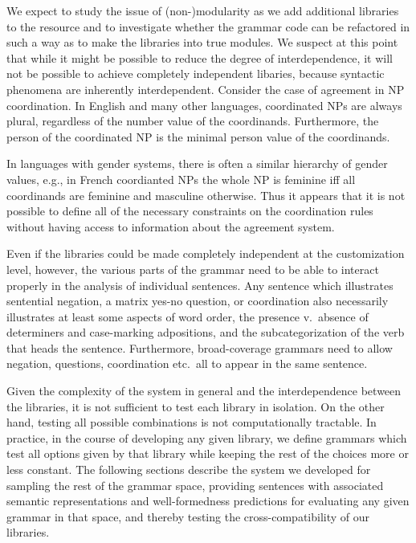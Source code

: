 \documentclass[11pt]{article}
\begin{document}
We expect to study the issue of (non-)modularity as we add additional
libraries to the resource and to investigate whether the grammar code
can be refactored in such a way as to make the libraries into true
modules.  We suspect at this point that while it might be possible to
reduce the degree of interdependence, it will not be possible to
achieve completely independent libaries, because syntactic phenomena
are inherently interdependent. Consider the case of
agreement in NP coordination. In English and many other languages, 
coordinated NPs are always plural, regardless of the number value of the
coordinands.  Furthermore, the person of the coordinated NP is the
minimal person value of the coordinands.  

%
In languages with gender systems, there is often a similar hierarchy
of gender values, e.g., in French coordianted NPs the whole NP is feminine
iff all coordinands are feminine and masculine otherwise.  Thus
it appears that it is not possible to define all of the necessary
constraints on the coordination rules without having access to information
about the agreement system.  

Even if the libraries could be made completely independent at the
customization level, however, the various parts of the grammar need to
be able to interact properly in the analysis of individual sentences.
Any sentence which illustrates sentential negation, a matrix yes-no
question, or coordination also necessarily illustrates at least some
aspects of word order, the presence v.\ absence of determiners and
case-marking adpositions, and the subcategorization of the verb that
heads the sentence.  Furthermore, broad-coverage grammars need to
allow negation, questions, coordination etc.\ all to appear in the
same sentence.

Given the complexity of the system in general and the interdependence
between the libraries, it is not sufficient to test each library in
isolation.  On the other hand, testing all possible combinations is
not computationally tractable.  In practice, in the course of developing
any given library, we define grammars which test all options given
by that library while keeping the rest of the choices more or less constant.
The following sections describe the system we developed for sampling
the rest of the grammar space, providing sentences with associated semantic
representations and well-formedness predictions 
for evaluating any given grammar in that space, and
thereby testing the cross-compatibility of our libraries.
\end{document}
